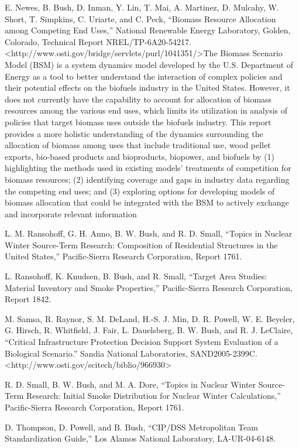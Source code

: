 \documentclass[]{article}
\begin{document}
E. Newes, B. Bush, D. Inman, Y. Lin, T. Mai, A. Martinez, D. Mulcahy, W.
Short, T. Simpkins, C. Uriarte, and C. Peck, ``Biomass Resource
Allocation among Competing End Uses,'' National Renewable Energy
Laboratory, Golden, Colorado, Technical Report NREL/TP-6A20-54217.
\textless{}http://www.osti.gov/bridge/servlets/purl/1041351/\textgreater{}The
Biomass Scenario Model (BSM) is a system dynamics model developed by the
U.S. Department of Energy as a tool to better understand the interaction
of complex policies and their potential effects on the biofuels industry
in the United States. However, it does not currently have the capability
to account for allocation of biomass resources among the various end
uses, which limits its utilization in analysis of policies that target
biomass uses outside the biofuels industry. This report provides a more
holistic understanding of the dynamics surrounding the allocation of
biomass among uses that include traditional use, wood pellet exports,
bio-based products and bioproducts, biopower, and biofuels by (1)
highlighting the methods used in existing models' treatments of
competition for biomass resources; (2) identifying coverage and gaps in
industry data regarding the competing end uses; and (3) exploring
options for developing models of biomass allocation that could be
integrated with the BSM to actively exchange and incorporate relevant
information

L. M. Ransohoff, G. H. Anno, B. W. Bush, and R. D. Small, ``Topics in
Nuclear Winter Source-Term Research: Composition of Residential
Structures in the United States,'' Pacific-Sierra Research Corporation,
Report 1761.

L. Ransohoff, K. Knudsen, B. Bush, and R. Small, ``Target Area Studies:
Material Inventory and Smoke Properties,'' Pacific-Sierra Research
Corporation, Report 1842.

M. Samsa, R. Raynor, S. M. DeLand, H.-S. J. Min, D. R. Powell, W. E.
Beyeler, G. Hirsch, R. Whitfield, J. Fair, L. Dauelsberg, B. W. Bush,
and R. J. LeClaire, ``Critical Infrastructure Protection Decision
Support System Evaluation of a Biological Scenario.'' Sandia National
Laboratories, SAND2005-2399C.
\textless{}http://www.osti.gov/scitech/biblio/966930\textgreater{}

R. D. Small, B. W. Bush, and M. A. Dore, ``Topics in Nuclear Winter
Source-Term Research: Initial Smoke Distribution for Nuclear Winter
Calculations,'' Pacific-Sierra Research Corporation, Report 1761.

D. Thompson, D. Powell, and B. Bush, ``CIP/DSS Metropolitan Team
Standardization Guide,'' Los Alamos National Laboratory, LA-UR-04-6148.
\end{document}
